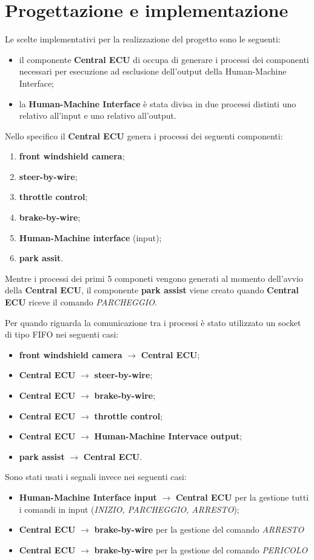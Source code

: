 \documentclass[12pt]{article}
\begin{document}
\section{Progettazione e implementazione}
Le scelte implementativi per la realizzazione del progetto sono le seguenti:
\begin{itemize}
    \item il componente {\bf Central ECU} di occupa di generare i processi dei 
    componenti necessari per esecuzione ad esclusione dell'output della Human-Machine 
    Interface;
    \item la {\bf Human-Machine Interface} \`{e} stata divisa in due processi 
    distinti uno relativo all'input e uno relativo all'output. 
\end{itemize}
Nello specifico il {\bf Central ECU} genera i processi dei seguenti componenti:
\begin{enumerate}
    \item {\bf front windshield camera};
    \item {\bf steer-by-wire};
    \item {\bf throttle control};
    \item {\bf brake-by-wire};
    \item {\bf Human-Machine interface} (input);
    \item {\bf park assit}.
\end{enumerate}
Mentre i processi dei primi 5 componeti vengono generati al momento dell'avvio 
della {\bf Central ECU}, il componente {\bf park assist} viene creato quando 
{\bf Central ECU} riceve il comando {\it PARCHEGGIO}. 

Per quando riguarda la comunicazione tra i processi \`{e} stato utilizzato un 
socket di tipo FIFO nei seguenti casi:
\begin{itemize}
    \item {\bf front windshield camera} $\to$ {\bf Central ECU};
    \item {\bf Central ECU} $\to$ {\bf steer-by-wire};
    \item {\bf Central ECU} $\to$ {\bf brake-by-wire};
    \item {\bf Central ECU} $\to$ {\bf throttle control};
    \item {\bf Central ECU} $\to$ {\bf Human-Machine Intervace output};
    \item {\bf park assist} $\to$ {\bf Central ECU}.
\end{itemize} 

Sono stati usati i segnali invece nei seguenti casi:
\begin{itemize}
    \item {\bf Human-Machine Interface input} $\to$ {\bf Central ECU} per la 
    gestione tutti i comandi in input ({\it INIZIO, PARCHEGGIO, ARRESTO});
    \item {\bf Central ECU} $\to$ {\bf brake-by-wire} per la gestione del comando 
    {\it ARRESTO}
    \item  {\bf Central ECU} $\to$ {\bf brake-by-wire} per la gestione del comando 
    {\it PERICOLO}
\end{itemize}
\end{document}
